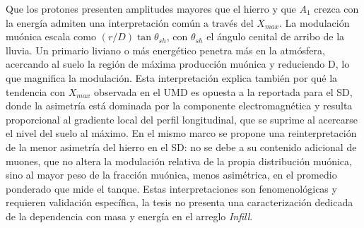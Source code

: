 Que los protones presenten amplitudes mayores que el hierro y que $A_1$ crezca con la energía admiten una interpretación común a través del $X_{max}$. La modulación muónica escala como $(r/D)\tan\theta_{sh}$, con $\theta_{sh}$ el ángulo cenital de arribo de la lluvia. Un primario liviano o más energético penetra más en la atmósfera, acercando al suelo la región de máxima producción muónica y reduciendo D, lo que magnifica la modulación. Esta interpretación explica también por qué la tendencia con $X_{max}$ observada en el UMD es opuesta a la reportada para el SD, donde la asimetría está dominada por la componente electromagnética y resulta proporcional al gradiente local del perfil longitudinal, que se suprime al acercarse el nivel del suelo al máximo. En el mismo marco se propone una reinterpretación de la menor asimetría del hierro en el SD: no se debe a su contenido adicional de muones, que no altera la modulación relativa de la propia distribución muónica, sino al mayor peso de la fracción muónica, menos asimétrica, en el promedio ponderado que mide el tanque. Estas interpretaciones son fenomenológicas y requieren validación específica, la tesis no presenta una caracterización dedicada de la dependencia con masa y energía en el arreglo \textit{Infill}.


